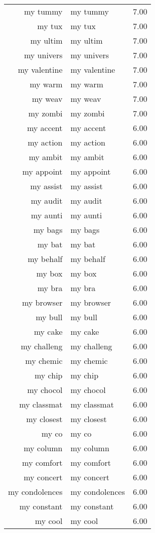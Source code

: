 \begin{table}[ht]
\begin{tabular}{rlr}
  my tummy & my tummy & 7.00 \\ 
  my tux & my tux & 7.00 \\ 
  my ultim & my ultim & 7.00 \\ 
  my univers & my univers & 7.00 \\ 
  my valentine & my valentine & 7.00 \\ 
  my warm & my warm & 7.00 \\ 
  my weav & my weav & 7.00 \\ 
  my zombi & my zombi & 7.00 \\ 
  my accent & my accent & 6.00 \\ 
  my action & my action & 6.00 \\ 
  my ambit & my ambit & 6.00 \\ 
  my appoint & my appoint & 6.00 \\ 
  my assist & my assist & 6.00 \\ 
  my audit & my audit & 6.00 \\ 
  my aunti & my aunti & 6.00 \\ 
  my bags & my bags & 6.00 \\ 
  my bat & my bat & 6.00 \\ 
  my behalf & my behalf & 6.00 \\ 
  my box & my box & 6.00 \\ 
  my bra & my bra & 6.00 \\ 
  my browser & my browser & 6.00 \\ 
  my bull & my bull & 6.00 \\ 
  my cake & my cake & 6.00 \\ 
  my challeng & my challeng & 6.00 \\ 
  my chemic & my chemic & 6.00 \\ 
  my chip & my chip & 6.00 \\ 
  my chocol & my chocol & 6.00 \\ 
  my classmat & my classmat & 6.00 \\ 
  my closest & my closest & 6.00 \\ 
  my co & my co & 6.00 \\ 
  my column & my column & 6.00 \\ 
  my comfort & my comfort & 6.00 \\ 
  my concert & my concert & 6.00 \\ 
  my condolences & my condolences & 6.00 \\ 
  my constant & my constant & 6.00 \\ 
  my cool & my cool & 6.00 \\ 

\end{tabular}
\end{table}
